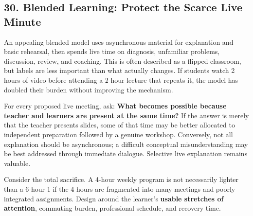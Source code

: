 \subsection*{30. Blended Learning: Protect the Scarce Live Minute}

An appealing blended model uses asynchronous material for explanation and basic rehearsal, then spends live time on diagnosis, unfamiliar problems, discussion, review, and coaching. This is often described as a flipped classroom, but labels are less important than what actually changes. If students watch 2 hours of video before attending a 2-hour lecture that repeats it, the model has doubled their burden without improving the mechanism.

For every proposed live meeting, ask: \textbf{What becomes possible because teacher and learners are present at the same time?} If the answer is merely that the teacher presents slides, some of that time may be better allocated to independent preparation followed by a genuine workshop. Conversely, not all explanation should be asynchronous; a difficult conceptual misunderstanding may be best addressed through immediate dialogue. Selective live explanation remains valuable.

Consider the total sacrifice. A 4-hour weekly program is not necessarily lighter than a 6-hour 1 if the 4 hours are fragmented into many meetings and poorly integrated assignments. Design around the learner's \textbf{usable stretches of attention}, commuting burden, professional schedule, and recovery time.
